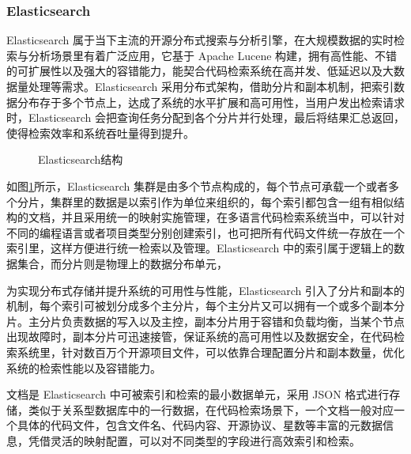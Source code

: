 \documentclass[UTF8,a4paper,12pt]{ctexart}
\numberwithin{equation}{section}
\begin{document}
\subsubsection{Elasticsearch}
Elasticsearch\cite{ref13} 属于当下主流的开源分布式搜索与分析引擎，在大规模数据的实时检索与分析场景里有着广泛应用，它基于 Apache Lucene 构建，拥有高性能、不错的可扩展性以及强大的容错能力，能契合代码检索系统在高并发、低延迟以及大数据量处理等需求。Elasticsearch 采用分布式架构，借助分片和副本机制，把索引数据分布存于多个节点上，达成了系统的水平扩展和高可用性，当用户发出检索请求时，Elasticsearch 会把查询任务分配到各个分片并行处理，最后将结果汇总返回，使得检索效率和系统吞吐量得到提升。\par
\begin{figure}[H]
	\caption{Elasticsearch结构}
	\label{es}
\end{figure}
如图\ref{es}所示，Elasticsearch 集群是由多个节点构成的，每个节点可承载一个或者多个分片，集群里的数据是以索引作为单位来组织的，每个索引都包含一组有相似结构的文档，并且采用统一的映射实施管理，在多语言代码检索系统当中，可以针对不同的编程语言或者项目类型分别创建索引，也可把所有代码文件统一存放在一个索引里，这样方便进行统一检索以及管理。Elasticsearch 中的索引属于逻辑上的数据集合，而分片则是物理上的数据分布单元，\par
为实现分布式存储\cite{ref13.5}并提升系统的可用性与性能，Elasticsearch 引入了分片和副本的机制，每个索引可被划分成多个主分片，每个主分片又可以拥有一个或多个副本分片。主分片负责数据的写入以及主控，副本分片用于容错和负载均衡\cite{ref13.7}，当某个节点出现故障时，副本分片可迅速接管，保证系统的高可用性以及数据安全，在代码检索系统里，针对数百万个开源项目文件，可以依靠合理配置分片和副本数量，优化系统的检索性能以及容错能力。\par
文档是 Elasticsearch 中可被索引和检索的最小数据单元，采用 JSON 格式进行存储，类似于关系型数据库中的一行数据，在代码检索场景下，一个文档一般对应一个具体的代码文件，包含文件名、代码内容、开源协议、星数等丰富的元数据信息，凭借灵活的映射配置，可以对不同类型的字段进行高效索引和检索。\par
\end{document}
